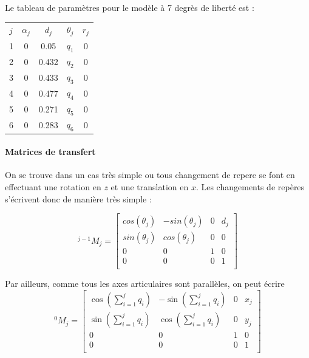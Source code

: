 \documentclass[a4paper, 10pt ]{article}
\begin{document}
Le tableau de paramètres pour le modèle à 7 degrès de liberté est : 

\begin{center}
\begin{tabular}{l c c c c}
$j$ & $\alpha_j$ & $d_j$ & $\theta_j$ & $r_j$\\
1 & 0 & 0.05 &$q_1$ & 0 \\
2 & 0 & 0.432 &$q_2$ & 0 \\
3 & 0 & 0.433 &$q_3$ & 0 \\
4 & 0 & 0.477 &$q_4$ & 0 \\
5 & 0 & 0.271 &$q_5$ & 0 \\
6 & 0 & 0.283 &$q_6$ & 0 
\end{tabular}
\end{center}


\paragraph{Matrices de transfert}
On se trouve dans un cas très simple ou tous changement de repere se font en effectuant une rotation en $z$ et une translation en $x$. Les changements de repères s'écrivent donc de manière très simple :

\begin{equation}
^{j-1}M_j =\begin{bmatrix}
							cos(\theta_j) & -sin(\theta_j) & 0 & d_j \\
							sin(\theta_j) & cos(\theta_j) & 0 & 0 \\
							0 & 0 & 1 & 0 \\
							0 & 0 & 0 & 1 \\
					\end{bmatrix}
\label{eq:changementRepere}
\end{equation} 

Par ailleurs, comme tous les axes articulaires sont parallèles, on peut écrire
\begin{equation}
^{0}M_j =\begin{bmatrix}
							\cos(\sum_{i=1}^j q_i) & -\sin(\sum_{i=1}^j q_i) & 0 & x_j \\
							\sin(\sum_{i=1}^j q_i) & \cos(\sum_{i=1}^j q_i) & 0 & y_j \\
							0 & 0 & 1 & 0 \\
							0 & 0 & 0 & 1 \\
					\end{bmatrix}
\label{eq:changementRepereDirect}
\end{equation} 
\end{document}
